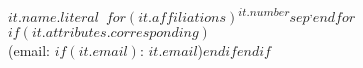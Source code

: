 $it.name.literal$~$for(it.affiliations)$\textsuperscript{$it.number$}$sep$\textsuperscript{,}$endfor$$if(it.attributes.corresponding)$\\\small (email: $if(it.email)$: \href{mailto:$it.email$}{$it.email$})$endif$$endif$